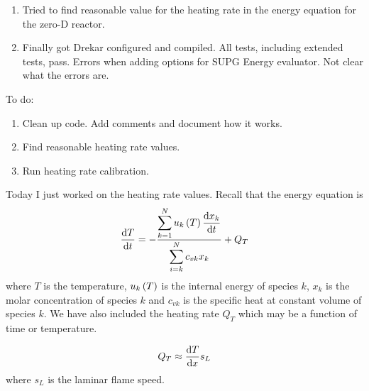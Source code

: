 
\begin{enumerate}
  \item Tried to find reasonable value for the heating rate in the energy equation for the zero-D reactor.
  \item Finally got Drekar configured and compiled.  All tests, including extended tests, pass.  Errors when adding options for SUPG Energy evaluator.  Not clear what the errors are.
\end{enumerate}

To do:
\begin{enumerate}
  \item Clean up code.  Add comments and document how it works.
  \item Find reasonable heating rate values.
  \item Run heating rate calibration.
\end{enumerate}
Today I just worked on the heating rate values.
Recall that the energy equation is
\begin{align}
  \frac{\mathrm{d} T}{\mathrm{d} t} = -\dfrac{\displaystyle\sum_{k=1}^{N}{u_{k}\left(T\right)\frac{\mathrm{d} x_{k}}{\mathrm{d} t}}}{\displaystyle\sum_{i=k}^{N}{c_{vk}x_{k}}} + Q_{T}
\end{align}
where $T$ is the temperature, $u_{k}\left(T\right)$ is the internal energy of species $k$, $x_{k}$ is the molar concentration of species $k$ and $c_{vk}$ is the specific heat at constant volume of species $k$.  We have also included the heating rate $Q_{T}$ which may be a function of time or temperature.

\begin{tcolorbox}[colback=blue!5, colframe=blue!40!black, title=Estimate of Heating Rate]
  \begin{align*}
    Q_{T} \approx \frac{\mathrm{d} T}{\mathrm{d} x}s_{L}
  \end{align*}
  where $s_{L}$ is the laminar flame speed.
\end{tcolorbox}

